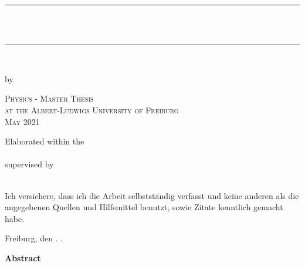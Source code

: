 \newcommand{\HRule}{\rule{\linewidth}{0.2mm}}

\begin{titlepage}	
	\begin{center}

		\HRule \\[0.8cm]
		{ \huge \bfseries \vtitle}\\[0.4cm]
		\HRule \\[0.4cm]

		\vspace{10pt}

		{ \Large by \vauthor }

		\vspace{120pt}
		
		\textsc{\Large Physics - Master Thesis\\[0.5cm] 
			at the Albert-Ludwigs University of Freiburg\\[0.5cm]
			May 2021\\[0.5cm]}

		\vspace{100pt}	

		\Large{	Elaborated within the\\ 
			\vinstitute\\
			supervised by \\
 			\vsupervision\\}

	\end{center}
	\vspace{2cm}
\end{titlepage}
\pagebreak



\hspace{2cm}

{\large Ich versichere, dass ich die Arbeit selbstständig verfasst und keine anderen als die 		angegebenen Quellen und Hilfsmittel benutzt, sowie Zitate kenntlich gemacht habe.\par} 
\vspace{1.2cm}
{\large Freiburg, den } \underline{\hspace{0.6cm}} . \underline{\hspace{0.6cm}} . \underline{\hspace{1.2cm}}   \hspace{2.5cm} \underline{\hspace{3.5cm}}
\newpage


\mbox{}
\vspace{10pt}
\begin{center}
	\textbf{Abstract}\qquad
\end{center}
	\presummary


